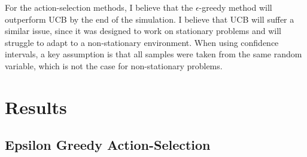 \documentclass{article}
\begin{document}
For the action-selection methods, I believe that the $\epsilon$-greedy method will outperform UCB by the end of the simulation. I believe that UCB will suffer a similar issue, since it was designed to work on stationary problems and will struggle to adapt to a non-stationary environment. When using confidence intervals, a key assumption is that all samples were taken from the same random variable, which is not the case for non-stationary problems.

\section{Results}
\subsection{Epsilon Greedy Action-Selection}
\maketitle
\end{document}
